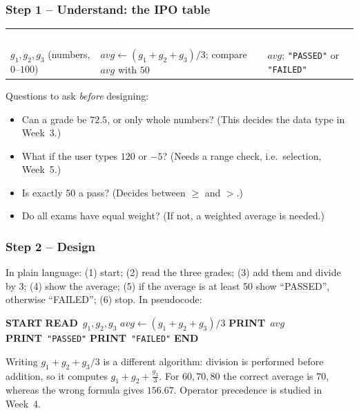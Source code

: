 \documentclass[11pt,a4paper]{article}
\newcommand{\READ}{\textbf{READ}\ }
\newcommand{\PRINT}{\textbf{PRINT}\ }
\newcommand{\START}{\State \textbf{START}}
\newcommand{\STOP}{\State \textbf{END}}
\newcommand{\str}[1]{\texttt{"#1"}}
\newcommand{\hdr}[1]{\textcolor{white}{\sffamily\bfseries #1}}
\newcommand{\hrow}{\rowcolor{ink}}
\begin{document}
\subsubsection{Step 1 -- Understand: the IPO table}
\begin{center}\small
\begin{tabularx}{\linewidth}{LLL}
\hrow \hdr{Input} & \hdr{Process} & \hdr{Output}\\
$g_1, g_2, g_3$ (numbers, $0$--$100$) & $avg \gets (g_1+g_2+g_3)/3$; compare $avg$ with $50$ & $avg$; \str{PASSED} or \str{FAILED}\\ \bottomrule
\end{tabularx}
\end{center}
Questions to ask \emph{before} designing:
\begin{itemize}[leftmargin=*,itemsep=0pt]
  \item Can a grade be $72.5$, or only whole numbers? (This decides the data type in Week~3.)
  \item What if the user types $120$ or $-5$? (Needs a range check, i.e.\ selection, Week~5.)
  \item Is exactly $50$ a pass? (Decides between $\ge$ and $>$.)
  \item Do all exams have equal weight? (If not, a weighted average is needed.)
\end{itemize}

\subsubsection{Step 2 -- Design}
In plain language: (1) start; (2) read the three grades; (3) add them and divide by 3; (4) show the average; (5) if the average is at least 50 show ``PASSED'', otherwise ``FAILED''; (6) stop. In pseudocode:

\begin{pseudobox}
\begin{algorithmic}[1]
\START
\State \READ $g_1, g_2, g_3$
\State $avg \gets (g_1 + g_2 + g_3)/3$
\State \PRINT $avg$
  \State \PRINT \str{PASSED}
\ElseX
  \State \PRINT \str{FAILED}
\EndIfX
\STOP
\end{algorithmic}
\end{pseudobox}

\begin{warnbox}
Writing $g_1 + g_2 + g_3/3$ is a different algorithm: division is performed before addition, so it computes $g_1+g_2+\frac{g_3}{3}$. For $60, 70, 80$ the correct average is $70$, whereas the wrong formula gives $156.67$. Operator precedence is studied in Week~4.
\end{warnbox}
\end{document}
